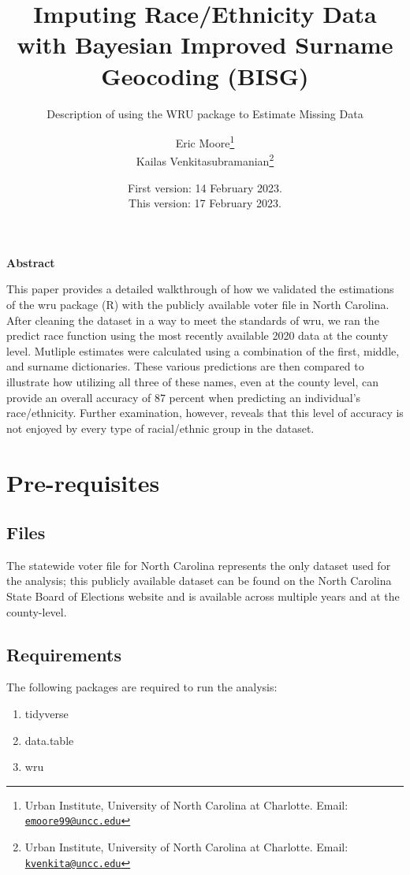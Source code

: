 \documentclass[
]{article}
\title{Imputing Race/Ethnicity Data with Bayesian Improved Surname
Geocoding (BISG)}
\subtitle{Description of using the WRU package to Estimate Missing Data}
\author{Eric Moore\footnote{Urban Institute, University of North
  Carolina at Charlotte. Email:
  \href{mailto:emoore99@uncc.edu}{\nolinkurl{emoore99@uncc.edu}}}\\
Kailas Venkitasubramanian\footnote{Urban Institute, University of North
  Carolina at Charlotte. Email:
  \href{mailto:kvenkita@uncc.edu}{\nolinkurl{kvenkita@uncc.edu}}}}
\date{First version: 14 February 2023.\\
This version: 17 February 2023.}
\providecommand{\tightlist}{%
  \setlength{\itemsep}{0pt}\setlength{\parskip}{0pt}}
\begin{document}
\maketitle

\vfill

\textbf{Abstract}

This paper provides a detailed walkthrough of how we validated the
estimations of the wru package (R) with the publicly available voter
file in North Carolina. After cleaning the dataset in a way to meet the
standards of wru, we ran the predict race function using the most
recently available 2020 data at the county level. Mutliple estimates
were calculated using a combination of the first, middle, and surname
dictionaries. These various predictions are then compared to illustrate
how utilizing all three of these names, even at the county level, can
provide an overall accuracy of 87 percent when predicting an
individual's race/ethnicity. Further examination, however, reveals that
this level of accuracy is not enjoyed by every type of racial/ethnic
group in the dataset.

\newpage

\hypertarget{pre-requisites}{%
\section{Pre-requisites}\label{pre-requisites}}

\hypertarget{files}{%
\subsection{Files}\label{files}}

The statewide voter file for North Carolina represents the only dataset
used for the analysis; this publicly available dataset can be found on
the North Carolina State Board of Elections website and is available
across multiple years and at the county-level.

\hypertarget{requirements}{%
\subsection{Requirements}\label{requirements}}

The following packages are required to run the analysis:

\begin{enumerate}
\def\labelenumi{\arabic{enumi}.}
\tightlist
\item
  tidyverse
\item
  data.table
\item
  wru
\end{enumerate}
\end{document}
